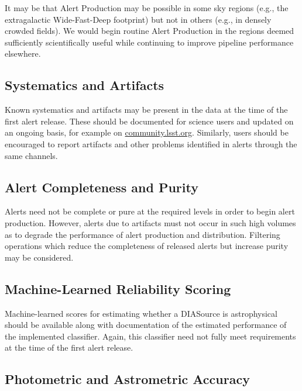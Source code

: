 \documentclass[OPS,authoryear,toc]{lsstdoc}
\begin{document}

It may be that Alert Production may be possible in some sky regions (e.g., the extragalactic Wide-Fast-Deep footprint) but not in others (e.g., in densely crowded fields).
We would begin routine Alert Production in the regions deemed sufficiently scientifically useful while continuing to improve pipeline performance elsewhere.


\subsection{Systematics and Artifacts}


Known systematics and artifacts may be present in the data at the time of the first alert release.
These should be documented for science users and updated on an ongoing basis, for example on \url{community.lsst.org}.
Similarly, users should be encouraged to report artifacts and other problems identified in alerts through the same channels.

\subsection{Alert Completeness and Purity}

Alerts need not be complete or pure at the required levels in order to begin alert production.
However, alerts due to artifacts must not occur in such high volumes as to degrade the performance of alert production and distribution.
Filtering operations which reduce the completeness of released alerts but increase purity may be considered.


\subsection{Machine-Learned Reliability Scoring}

Machine-learned scores for estimating whether a DIASource is astrophysical should be available along with documentation of the estimated performance of the implemented classifier.  
Again, this classifier need not fully meet requirements at the time of the first alert release.

\subsection{Photometric and Astrometric Accuracy}
\end{document}
